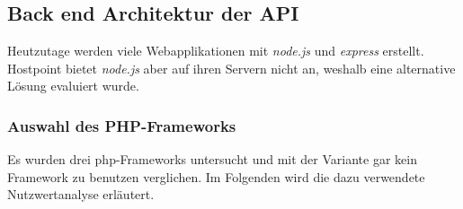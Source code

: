 \subsection{Back end Architektur der API}
Heutzutage werden viele Webapplikationen mit \emph{node.js} und \emph{express} erstellt. Hostpoint bietet \emph{node.js} aber auf ihren Servern nicht an, weshalb eine alternative Lösung evaluiert wurde.

\subsubsection{Auswahl des PHP-Frameworks}
Es wurden drei php-Frameworks untersucht und mit der Variante gar kein Framework zu benutzen verglichen. Im Folgenden wird die dazu verwendete Nutzwertanalyse erläutert.

